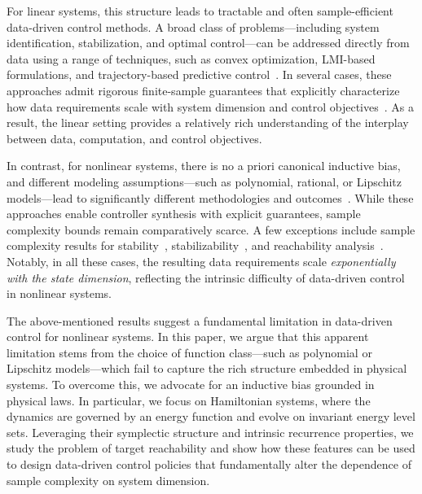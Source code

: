 \documentclass[letterpaper, 10 pt, conference]{ieeeconf}
\begin{document}
For linear systems, this structure leads to tractable and often sample-efficient data-driven control methods. A broad class of problems—including system identification, stabilization, and optimal control—can be addressed directly from data using a range of techniques, such as convex optimization, LMI-based formulations, and trajectory-based predictive control~\cite{oymak2018nonasymptotic,zheng2021nonasymptotic,hu2022sample,werner2024sample,toso2025learning,dean2020sample,depersis2019formulas,coulson2019data,berberich2020data}. In several cases, these approaches admit rigorous finite-sample guarantees that explicitly characterize how data requirements scale with system dimension and control objectives~\cite{oymak2018nonasymptotic,zheng2021nonasymptotic,hu2022sample,werner2024sample,dean2020sample}. As a result, the linear setting provides a relatively rich understanding of the interplay between data, computation, and control objectives.

In contrast, for nonlinear systems, there is no a priori canonical inductive bias, and different modeling assumptions—such as polynomial, rational, or Lipschitz models—lead to significantly different methodologies and outcomes~\cite{dai2020semi,guo2021data,strasser2021data,monshizadeh2025versatile}. While these approaches enable controller synthesis with explicit guarantees, sample complexity bounds remain comparatively scarce. A few exceptions include sample complexity results for stability~\cite{boffi2020learning}, stabilizability~\cite{siegelmann2025data}, and reachability analysis~\cite{lew2022simple}. Notably, in all these cases, the resulting data requirements scale \textit{exponentially with the state dimension}, reflecting the intrinsic difficulty of data-driven control in nonlinear systems.


The above-mentioned results suggest a fundamental limitation in data-driven control for nonlinear systems. In this paper, we argue that this apparent limitation stems from the choice of function class—such as polynomial or Lipschitz models—which fail to capture the rich structure embedded in physical systems. To overcome this, we advocate for an inductive bias grounded in physical laws. In particular, we focus on Hamiltonian systems, where the dynamics are governed by an energy function and evolve on invariant energy level sets. Leveraging their symplectic structure and intrinsic recurrence properties, we study the problem of target reachability and show how these features can be used to design data-driven control policies that fundamentally alter the dependence of sample complexity on system dimension.
\end{document}
